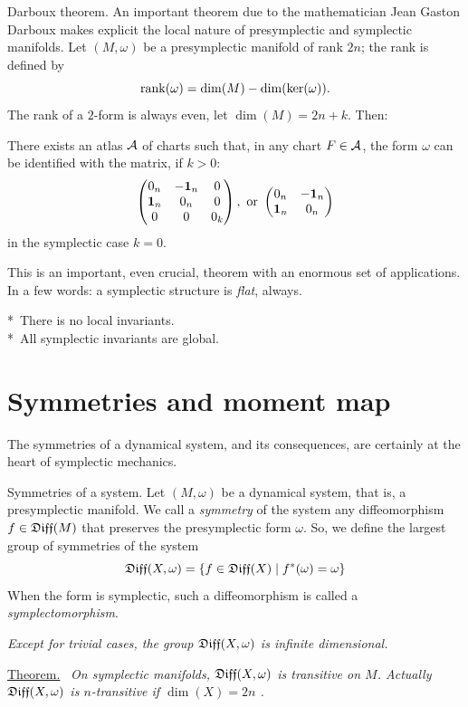 \begin{Article}{Darboux theorem.}{}
  An important theorem due to the mathematician Jean Gaston Darboux makes explicit the local nature of presymplectic and symplectic manifolds.
  Let $(M, \omega)$ be a presymplectic manifold of rank $2n$;
  the rank is defined by
  $$%
    \Rank(\omega) = \dim(M) - \dim(\ker(\omega)).
    $$%
  The rank of a $2$-form is always even,
  let $\dim(M) = 2n + k$.
  Then:
  
  There exists an atlas $\mathcal{A}$ of charts such that,
  in any chart $F \in \mathcal{A}$,
  the form $\omega$ can be identified with the matrix,
  if $k>0$:
  $$%
    \Vector{0_n & -\Id_n & 0 \\ \Id_n & 0_n & 0 \\ 0 & 0 & 0_k},
    \SpacedText{or}
    \Vector{0_n & -\Id_n \\ \Id_n & 0_n}
    $$%
  in the symplectic case $k=0$.
  
  This is an important,
  even crucial,
  theorem with an enormous set of applications.
  In a few words:
  a symplectic structure is \emph{flat},
  always.
  
  *~There is no local invariants. \\[.5ex]
  *~All symplectic invariants are global.
  
\end{Article}

\section{Symmetries and moment map}

The symmetries of a dynamical system,
and its consequences,
are certainly at the heart of symplectic mechanics.

\begin{Article}{Symmetries of a system.}{}
  Let $(M,\omega)$ be a dynamical system,
  that is,
  a presymplectic manifold.
  We call a \emph{symmetry} of the system any diffeomorphism $f \in \mathfrak{Diff}(M)$ that preserves the presymplectic form $\omega$.
  So,
  we define the largest group of symmetries of the system
  $$%
    \Diff(X,\omega) = \{ f \in \Diff(X) \mid f^*(\omega) = \omega \}
    $$%
  When the form is symplectic,
  such a diffeomorphism is called a \emph{symplectomorphism}.
  
   {\itshape Except for trivial cases,
  the group $\mathfrak{Diff}(X,\omega)$ is infinite dimensional.}
  
  \uline{Theorem.}~ {\it On symplectic manifolds,
  $\mathfrak{Diff}(X,\omega)$ is transitive on $M$.
  Actually $\mathfrak{Diff}(X,\omega)$ is $n$-transitive if $\dim(X) = 2n$ \cite{Boo69}.}
\end{Article}

